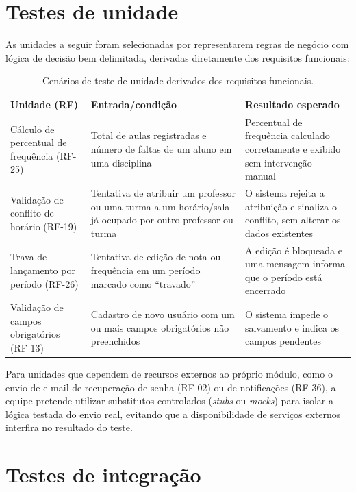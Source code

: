 \section{Testes de unidade}

As unidades a seguir foram selecionadas por representarem regras de negócio
com lógica de decisão bem delimitada, derivadas diretamente dos requisitos
funcionais:

\begin{table}[ht]
\centering
\caption{Cenários de teste de unidade derivados dos requisitos funcionais.}
\begin{tabularx}{\textwidth}{p{} X X}
\toprule
\textbf{Unidade (RF)} & \textbf{Entrada/condição} & \textbf{Resultado esperado} \\
\midrule
Cálculo de percentual de frequência (RF-25) &
Total de aulas registradas e número de faltas de um aluno em uma disciplina &
Percentual de frequência calculado corretamente e exibido sem intervenção manual \\
Validação de conflito de horário (RF-19) &
Tentativa de atribuir um professor ou uma turma a um horário/sala já ocupado por outro professor ou turma &
O sistema rejeita a atribuição e sinaliza o conflito, sem alterar os dados existentes \\
Trava de lançamento por período (RF-26) &
Tentativa de edição de nota ou frequência em um período marcado como ``travado'' &
A edição é bloqueada e uma mensagem informa que o período está encerrado \\
Validação de campos obrigatórios (RF-13) &
Cadastro de novo usuário com um ou mais campos obrigatórios não preenchidos &
O sistema impede o salvamento e indica os campos pendentes \\
\bottomrule
\end{tabularx}
\end{table}

Para unidades que dependem de recursos externos ao próprio módulo, como o
envio de e-mail de recuperação de senha (RF-02) ou de notificações (RF-36),
a equipe pretende utilizar substitutos controlados (\textit{stubs} ou
\textit{mocks}) para isolar a lógica testada do envio real, evitando que a
disponibilidade de serviços externos interfira no resultado do teste.

\section{Testes de integração}

